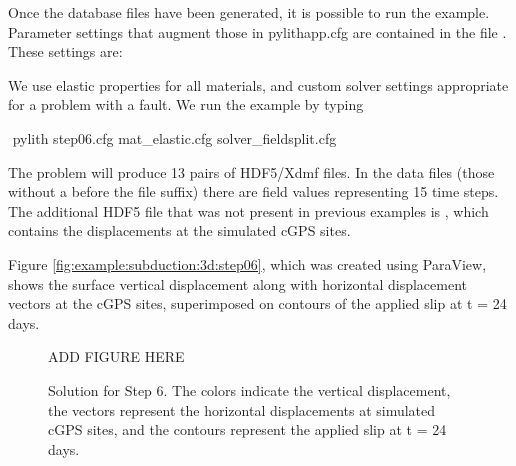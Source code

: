 Once the database files have been generated, it is possible to run the
example. Parameter settings that augment those in pylithapp.cfg are
contained in the file . These settings are:
\begin{inventory}
\end{inventory}
We use elastic properties for all materials, and custom solver
settings appropriate for a problem with a fault. We run the example by typing
\begin{shell}
$$ pylith step06.cfg mat_elastic.cfg solver_fieldsplit.cfg
\end{shell}
The problem will produce 13 pairs of HDF5/Xdmf files. In the data
files (those without a  before the file suffix) there
are field values representing 15 time steps. The additional HDF5 file
that was not present in previous examples is
, which contains the displacements at
the simulated cGPS sites.

Figure \vref{fig:example:subduction:3d:step06}, which was created
using ParaView, shows the surface vertical displacement along with
horizontal displacement vectors at the cGPS sites, superimposed on
contours of the applied slip at t = 24 days.

\begin{figure}
  ADD FIGURE HERE
  \caption{Solution for Step 6. The colors indicate the vertical
    displacement, the vectors represent the horizontal displacements
    at simulated cGPS sites, and the contours represent the applied
    slip at t = 24 days. }
  \label{fig:example:subduction:3d:step06}
\end{figure}


